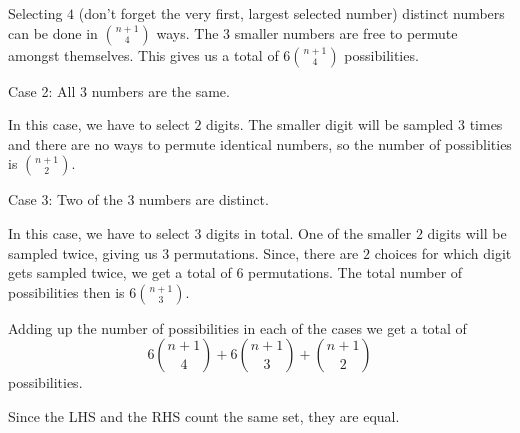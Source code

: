 \begin{enumerate}[label=(\alph*)]
  Selecting $4$ (don't forget the very first, largest selected number) 
  distinct numbers can be done in ${n+1 \choose 4}$ ways. The $3$ smaller 
  numbers are free to permute amongst themselves. This gives us a total of 
  $6{n+1 \choose 4}$ possibilities.
  
  Case 2: All $3$ numbers are the same.
  
  In this case, we have to select $2$ digits. The smaller digit will be sampled 
  $3$ times and there are no ways to permute identical numbers, so the number of 
  possiblities is ${n+1 \choose 2}$.
  
  Case 3: Two of the $3$ numbers are distinct.
  
  In this case, we have to select $3$ digits in total. One of the smaller $2$ 
  digits will be sampled twice, giving us $3$ permutations. Since, there are $2$ 
  choices for which digit gets sampled twice, we get a total of $6$ permutations. 
  The total number of possibilities then is $6{n+1 \choose 3}$.
  
  Adding up the number of possibilities in each of the cases we get a total of 
  $$6{n+1 \choose 4} + 6{n+1 \choose 3} + {n+1 \choose 2}$$ possibilities. 
  
  Since the LHS and the RHS count the same set, they are equal.

\end{enumerate}